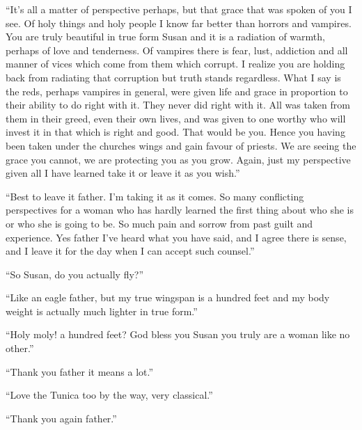 ``It's all a matter of perspective perhaps, but that grace that was spoken of you I see. Of holy things and holy people I know far better than horrors and vampires. You are truly beautiful in true form Susan and it is a radiation of warmth, perhaps of love and tenderness. Of vampires there is fear, lust, addiction and all manner of vices which come from them which corrupt. I realize you are holding back from radiating that corruption but truth stands regardless. What I say is the reds, perhaps vampires in general, were given life and grace in proportion to their ability to do right with it. They never did right with it. All was taken from them in their greed, even their own lives, and was given to one worthy who will invest it in that which is right and good. That would be you. Hence you having been taken under the churches wings and gain favour of priests. We are seeing the grace you cannot, we are protecting you as you grow. Again, just my perspective given all I have learned take it or leave it as you wish.''

``Best to leave it father. I'm taking it as it comes. So many conflicting perspectives for a woman who has hardly learned the first thing about who she is or who she is going to be. So much pain and sorrow from past guilt and experience. Yes father I've heard what you have said, and I agree there is sense, and I leave it for the day when I can accept such counsel.''

``So Susan, do you actually fly?''

``Like an eagle father, but my true wingspan is a hundred feet and my body weight is actually much lighter in true form.''

``Holy moly! a hundred feet? God bless you Susan you truly are a woman like no other.''

``Thank you father it means a lot.''

``Love the Tunica too by the way, very classical.''

``Thank you again father.''

